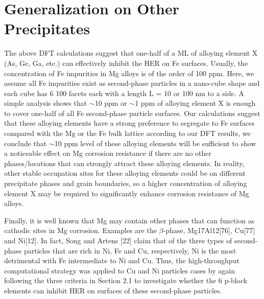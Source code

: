 \section{Generalization on Other Precipitates}

The above DFT calculations suggest that one-half of a \ac{ML} of alloying element X (As, Ge, Ga, etc.) can effectively inhibit the HER on Fe surfaces. Usually, the concentration of Fe impurities in Mg alloys is of the order of 100 ppm. Here, we assume all Fe impurities exist as second-phase particles in a nano-cube shape and each cube has 6 {100} facets each with a length L = 10 or 100 nm to a side. A simple analysis shows that $\sim$10 ppm or $\sim$1 ppm of alloying element X is enough to cover one-half of all Fe second-phase particle surfaces. Our calculations suggest that these alloying elements have a strong preference to segregate to Fe surfaces compared with the Mg or the Fe bulk lattice according to our DFT results, we conclude that $\sim$10 ppm level of these alloying elements will be sufficient to show a noticeable effect on Mg corrosion resistance if there are no other phases/locations that can strongly attract these alloying elements. In reality, other stable occupation sites for these alloying elements could be on different precipitate phases and grain boundaries, so a higher concentration of alloying element X may be required to significantly enhance corrosion resistance of Mg alloys.

Finally, it is well known that Mg may contain other phases that can function as cathodic sites in Mg corrosion. Examples are the $\beta$-phase, Mg17Al12[76], Cu[77] and Ni[12]. In fact, Song and Artens [22] claim that of the three types of second-phase particles that are rich in Ni, Fe and Cu, respectively, Ni is the most detrimental with Fe intermediate to Ni and Cu. Thus, the high-throughput computational strategy was applied to Cu and Ni particles cases by again following the three criteria in Section 2.1 to investigate whether the 6 p-block elements can inhibit HER on surfaces of these second-phase particles. 

